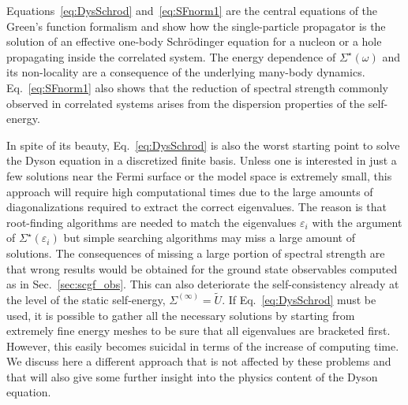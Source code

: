 Equations~\eqref{eq:DysSchrod} and~\eqref{eq:SFnorm1} are the central equations of the Green's function formalism and show how the
single-particle propagator is the solution of an effective one-body Schr\"odinger equation for a nucleon or a
hole propagating inside the correlated system. The energy dependence of  $\Sigma^\star(\omega)$  and its non-locality are a consequence of the underlying  many-body dynamics. Eq.~\eqref{eq:SFnorm1} also shows that the reduction of spectral strength commonly observed in correlated systems arises from the dispersion
properties of the self-energy.

 In spite of its beauty, Eq.~\eqref{eq:DysSchrod} is also the worst starting point to solve the Dyson equation in a discretized finite basis. Unless one is interested in just a few solutions near the Fermi surface or the model space is extremely small, this approach will require high computational times due to the large amounts of diagonalizations required to extract the correct eigenvalues. The reason is that root-finding algorithms are needed to match the eigenvalues $\varepsilon_i$ with the argument of  $\Sigma^\star(\varepsilon_i)$ but simple searching algorithms may miss a large amount of solutions. The consequences of missing a large portion of spectral strength are that wrong results would be obtained for the ground state observables computed as in Sec.~\ref{sec:scgf_obs}. This can also deteriorate the self-consistency already at the level of the static self-energy, $\Sigma^{(\infty)}=\widetilde{U}$.  If Eq.~\eqref{eq:DysSchrod} must be used, it is possible to gather all the necessary solutions by starting from extremely fine energy meshes to be sure that all eigenvalues are bracketed first. However, this easily becomes suicidal in terms of the increase of computing time.
We discuss here a different approach that is not affected by these problems and that will also give some further insight into the physics content of the Dyson equation.

